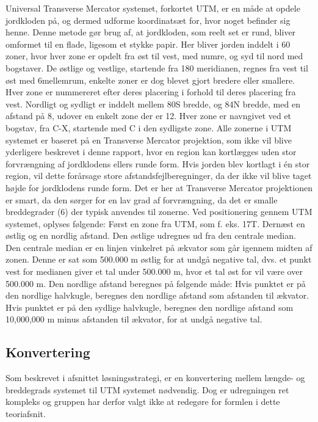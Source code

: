 Universal Transverse Mercator systemet, forkortet UTM, er en måde at opdele jordkloden på, og dermed udforme koordinatsæt for, hvor noget befinder sig henne. Denne metode gør brug af, at jordkloden, som reelt set er rund, bliver omformet til en flade, ligesom et stykke papir. Her bliver jorden inddelt i 60 zoner, hvor hver zone er opdelt fra øst til vest, med numre, og syd til nord med bogstaver. De østlige og vestlige, startende fra 180 meridianen, regnes fra vest til øst med 6\textdegree mellemrum, enkelte zoner er dog blevet gjort bredere eller smallere. Hver zone er nummereret efter deres placering i forhold til deres placering fra vest.\newline
Nordligt og sydligt er inddelt mellem 80\textdegree S bredde, og 84\textdegree N bredde, med en afstand på 8\textdegree, udover en enkelt zone der er 12\textdegree. Hver zone er  navngivet ved et bogstav, fra C-X, startende med C i den sydligste zone.
Alle zonerne i UTM systemet er baseret på en Transverse Mercator projektion, som ikke vil blive yderligere beskrevet i denne rapport, hvor en region kan kortlægges uden stor forvrængning af jordklodens ellers runde form. Hvis jorden blev kortlagt i én stor region, vil dette forårsage store afstandsfejlberegninger, da der ikke vil blive taget højde for jordklodens runde form. Det er her at Transverse Mercator projektionen er smart, da den sørger for en lav grad af forvrængning, da det er smalle breddegrader (6\textdegree) der typisk anvendes til zonerne. \newline
Ved positionering gennem UTM systemet, oplyses følgende: Først en zone fra UTM, som f. eks. 17T. Dernæst en østlig og en nordlig afstand. Den østlige udregnes ud fra den centrale median. Den centrale median er en linjen vinkelret på ækvator som går igennem midten af zonen. Denne er sat som 500.000 m østlig for at undgå negative tal, dvs. et punkt vest for medianen giver et tal under 500.000 m, hvor et tal øst for vil være over 500.000 m.  Den nordlige afstand beregnes på følgende måde: Hvis punktet er på den nordlige halvkugle, beregnes den nordlige afstand som afstanden til ækvator. Hvis punktet er på den sydlige halvkugle, beregnes den nordlige afstand som 10,000,000 m minus afstanden til ækvator, for at undgå negative tal. \citep{UTMTeori}

\subsection{Konvertering}
Som beskrevet i afsnittet løsningsstrategi, er en konvertering mellem længde- og breddegrads systemet til UTM systemet nødvendig. Dog er udregningen ret kompleks og gruppen har derfor valgt ikke at redegøre for formlen i dette teoriafsnit.

